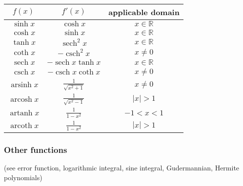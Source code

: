 \documentclass[12pt]{article}
\newcommand{\sech}{\operatorname{sech}}
\newcommand{\csch}{\operatorname{csch}}
\newcommand{\arsinh}{\operatorname{arsinh}}
\newcommand{\arcosh}{\operatorname{arcosh}}
\newcommand{\artanh}{\operatorname{artanh}}
\newcommand{\arcoth}{\operatorname{arcoth}}
\begin{document}
\subsubsection*{}

\begin{center}
\begin{tabular}{|c|c|c|}
\hline
$f(x)$ & $f'(x)$ & applicable domain \\
\hline\hline
$\sinh{x}$ & $\cosh{x}$ & $x\in \mathbb{R}$ \\
\hline
$\cosh{x}$ & $\sinh{x}$ & $x\in \mathbb{R}$ \\
\hline
$\tanh{x}$ & $\sech^2{x}$ & $x\in \mathbb{R}$ \\
\hline 
$\coth{x}$ & $-\csch^2{x}$ & $x\ne 0$ \\
\hline
$\sech{x}$ & $-\sech{x}\tanh{x}$ & $x\in \mathbb{R}$ \\
\hline
$\csch{x}$ & $-\csch{x}\coth{x}$ & $x\ne 0$ \\
\hline
$\arsinh{x}$ & $\displaystyle\frac{1}{\sqrt{x^2\!+\!1}}$ & $x\ne 0$ \\
\hline
$\arcosh{x}$ & $\displaystyle\frac{1}{\sqrt{x^2\!-\!1}}$ & $|x|>1$ \\
\hline
$\artanh{x}$ & $\displaystyle\frac{1}{1\!-\!x^2}$ & $-1 < x < 1$ \\
\hline
$\arcoth{x}$ & $\displaystyle\frac{1}{1\!-\!x^2}$ & $|x| > 1$ \\
\hline

\end{tabular}
\end{center}

\subsubsection*{Other functions} (see error function, logarithmic integral, sine integral, Gudermannian, Hermite polynomials)
\end{document}
